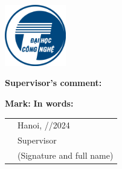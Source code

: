 \documentclass[oneside]{report}
\newcommand{\Pointilles}[1]{%
  \par\nobreak
  \noindent\rule{0pt}{1.5\baselineskip}%
  \multido{}{#1}{\noindent\makebox[\textwidth]{\dotfill}\endgraf}%
}
\begin{document}
\setcounter{secnumdepth}{3}
\renewcommand{\contentsname}{Table of Contents}
\tableofcontents

\clearpage

\listoffigures
\clearpage


\setcounter{page}{1}





% 



\renewcommand\bibname{References}

\begin{titlepage}
    \begin{center}
        \includegraphics[width=0.2\textwidth]{FrontMatter/uet.png} \\ %
        \vspace{0.5cm}
    \end{center}
    
    \noindent \textbf{ Supervisor's comment:}    
    \noindent \Pointilles{12}
    \begin{center}
        \textbf{Mark:} \underline{\hspace{2cm}} \hspace{1cm} \textbf{In words:} \underline{\hspace{5cm}}
    \end{center}
    
    \noindent\begin{tabular}{@{}>{\centering}p{}>{\centering}p{}@{}}
     & Hanoi, \underline{\hspace{1cm}}/\underline{\hspace{1cm}}/2024 \tabularnewline
     & Supervisor \tabularnewline
    & (Signature and full name) \tabularnewline
    \end{tabular} 
\end{titlepage}

% 
\end{document}

